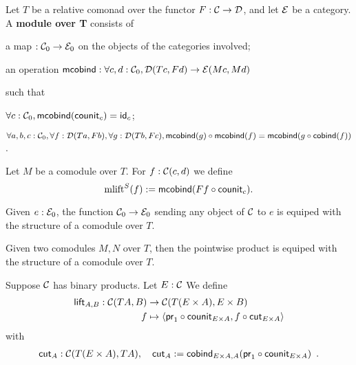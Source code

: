 \documentclass{amsart}
\newcommand{\fat}[1]{\textbf{#1}}
\begin{document}
\begin{definition}
 Let $T$ be a relative comonad over the functor $F:\C\to\D$, and let $\E$ be a category.
 A \fat{module over T} consists of
   \begin{packitem}
   \item a map $:\C_0 \to \E_0$ on the objects of the categories involved;
   \item an operation $\mcobind: \forall c,d:\C_0, \D(Tc,Fd) \to \E(Mc,Md)$
  \end{packitem}
  such that 
  \begin{packitem}
   \item $\forall c : \C_0, \mcobind(\counit_c) = \id_c$;
   \item $\forall a,b,c:\C_0, \forall f : \D(Ta,Fb),\forall g:\D(Tb,Fc), \\
        \comp{\mcobind(f)}{\mcobind(g)} = \mcobind(\comp{\cobind(f)}{g})$ .
  \end{packitem}

\end{definition}


\begin{definition}
 Let $M$ be a comodule over $T$. For $f : \C(c,d)$ we define
  \[ \mlift^S(f) := \mcobind(\comp{\counit_c}{Ff}) .  \]
\end{definition}


\begin{definition}
  Given $e:\E_0$, the function $\C_0\to\E_0$ sending any object of $\C$ to $e$ is equiped with
  the structure of a comodule over $T$.
\end{definition}


\begin{definition}
 Given two comodules $M,N$ over $T$, then the pointwise product is equiped with the structure of 
 a comodule over $T$.
\end{definition}

\begin{definition}
 Suppose $\C$ has binary products. Let $E : \C$
 We define
 \begin{align*} \lift_{A,B} : \C(TA,B) &\to \C(T(E\times A),E\times B)\\
                                   f   &\mapsto \langle \comp{\counit_{E\times A}}{\pr_1}, \comp{\cut_{E\times A}}{f} \rangle
\end{align*}
with 
\begin{align*}
               \cut_A: \C(T(E\times A), TA), \quad \cut_A := \cobind_{E \times A, A}(\comp{\counit_{E \times A}}{\pr_1}) \enspace .
\end{align*}



\end{definition}
\end{document}
